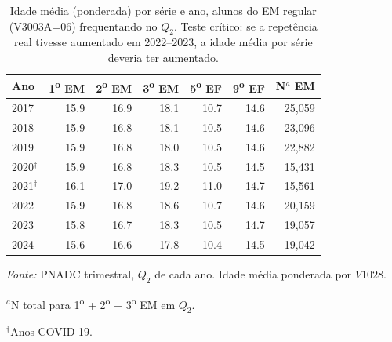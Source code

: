 \begin{table}[htbp]\centering
\caption{Idade m\'edia (ponderada) por s\'erie e ano, alunos do EM regular (V3003A=06) frequentando no $Q_2$. Teste cr\'itico: se a repet\^encia real tivesse aumentado em 2022--2023, a idade m\'edia por s\'erie deveria ter aumentado.}
\label{tab:idade_serie}
\begin{threeparttable}\small
\begin{tabular}{lrrrrrr}\toprule
Ano & 1\textsuperscript{o} EM & 2\textsuperscript{o} EM & 3\textsuperscript{o} EM & 5\textsuperscript{o} EF & 9\textsuperscript{o} EF & N$^{a}$ EM\\
\midrule
2017 & 15.9 & 16.9 & 18.1 & 10.7 & 14.6 & 25,059 \\
2018 & 15.9 & 16.8 & 18.1 & 10.5 & 14.6 & 23,096 \\
2019 & 15.9 & 16.8 & 18.0 & 10.5 & 14.6 & 22,882 \\
2020$^{\dagger}$ & 15.9 & 16.8 & 18.3 & 10.5 & 14.5 & 15,431 \\
2021$^{\dagger}$ & 16.1 & 17.0 & 19.2 & 11.0 & 14.7 & 15,561 \\
2022 & 15.9 & 16.8 & 18.6 & 10.7 & 14.6 & 20,159 \\
2023 & 15.8 & 16.7 & 18.3 & 10.5 & 14.7 & 19,057 \\
2024 & 15.6 & 16.6 & 17.8 & 10.4 & 14.5 & 19,042 \\
\bottomrule\end{tabular}
\begin{tablenotes}\footnotesize
\item \textit{Fonte:} PNADC trimestral, $Q_2$ de cada ano. Idade m\'edia ponderada por $V1028$.
\item $^{a}$N total para 1\textsuperscript{o} + 2\textsuperscript{o} + 3\textsuperscript{o} EM em $Q_2$.
\item $^{\dagger}$Anos COVID-19.
\end{tablenotes}\end{threeparttable}\end{table}
